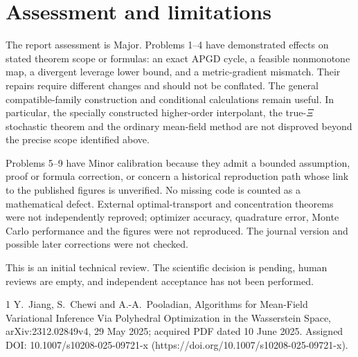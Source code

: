\documentclass[10pt]{article}
\begin{document}
\section*{Assessment and limitations}
The report assessment is Major. Problems 1–4 have demonstrated effects on stated theorem scope or formulas: an exact APGD cycle, a feasible nonmonotone map, a divergent leverage lower bound, and a metric-gradient mismatch. Their repairs require different changes and should not be conflated. The general compatible-family construction and conditional calculations remain useful. In particular, the specially constructed higher-order interpolant, the true-\(\Xi\) stochastic theorem and the ordinary mean-field method are not disproved beyond the precise scope identified above.\par
Problems 5–9 have Minor calibration because they admit a bounded assumption, proof or formula correction, or concern a historical reproduction path whose link to the published figures is unverified. No missing code is counted as a mathematical defect. External optimal-transport and concentration theorems were not independently reproved; optimizer accuracy, quadrature error, Monte Carlo performance and the figures were not reproduced. The journal version and possible later corrections were not checked.\par
This is an initial technical review. The scientific decision is pending, human reviews are empty, and independent acceptance has not been performed.\par
1 Y. Jiang, S. Chewi and A.-A. Pooladian, Algorithms for Mean-Field Variational Inference Via Polyhedral Optimization in the Wasserstein Space, arXiv:2312.02849v4, 29 May 2025; acquired PDF dated 10 June 2025. Assigned DOI: 10.1007/s10208-025-09721-x (https://doi.org/10.1007/s10208-025-09721-x).\par
\end{document}
